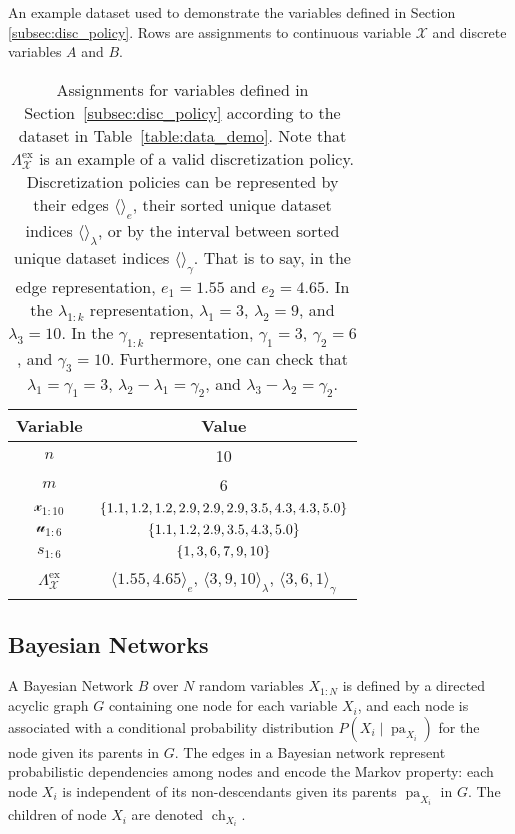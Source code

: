 \documentclass[twoside,11pt]{article}
\newcommand{\curly}[1]{\mathopen{}\mathclose\bgroup\left\{#1\aftergroup\egroup\right\}}
\newcommand{\anglebrackets}[1]{\langle #1 \rangle}
\DeclareMathOperator{\Pa}{pa} %
\DeclareMathOperator{\Ch}{ch} %
\newcommand{\cX}{\mathcal{X}} %
\newcommand{\cx}{\mathcal{x}} %
\newcommand{\cu}{\mathcal{u}} %
\begin{document}
\begin{table}[ht]
  \centering
  \caption{
    An example dataset used to demonstrate the variables defined in Section \ref{subsec:disc_policy}. Rows are assignments to continuous variable $\cX$ and discrete variables $A$ and $B$.
  }
  
  \label{table:data_demo}
  \bigskip
  \centering
  \caption{
    Assignments for variables defined in Section~\ref{subsec:disc_policy} according to the dataset in Table~\ref{table:data_demo}. Note that $\Lambda^{\text{ex}}_{\cX}$ is an example of a valid discretization policy. Discretization policies can be represented by their edges $\anglebrackets{}_{e}$, their sorted unique dataset indices $\anglebrackets{}_{\lambda}$, or by the interval between sorted unique dataset indices $\anglebrackets{}_{\gamma}$. That is to say, in the edge representation, $e_1 = 1.55$ and $e_2 = 4.65$. In the $\lambda_{1:k}$ representation, $\lambda_1 = 3$, $\lambda_2 = 9$, and $\lambda_3 = 10$. In the $\gamma_{1:k}$ representation, $\gamma_1 = 3$, $\gamma_2 = 6$, and $\gamma_3 = 10$. Furthermore, one can check that $\lambda_1 = \gamma_1 = 3$, $\lambda_2 - \lambda_1 = \gamma_2$, and $\lambda_3 - \lambda_2 = \gamma_2$.
  }
	\begin{tabular}{cc}
		\toprule
		Variable &  Value \\
		\midrule
		$n$ &  \num{10} \\
		$m$ &  \num{6} \\
		$\cx_{1:10}$ & $\curly{ 1.1, 1.2, 1.2, 2.9, 2.9, 2.9, 3.5, 4.3, 4.3, 5.0} $\\
		$\cu_{1:6} $ & $\curly{ 1.1,1.2,2.9,3.5,4.3,5.0}$\\
		$s_{1:6}$ & $\curly{1,3,6,7,9,10}$\\
		$\Lambda^{\text{ex}}_{\cX}$ & $\anglebrackets{1.55,4.65}_{e}$, $ \anglebrackets{3 ,9,10}_{\lambda}$, $\anglebrackets{3, 6, 1}_{\gamma} $\\
		\bottomrule
	\end{tabular}
  \label{table:data_demo_2}
\end{table}

\subsection{Bayesian Networks}

A Bayesian Network $B$ over $N$ random variables $X_{1:N}$ is defined by a directed acyclic graph $G$ containing one node for each variable $X_i$, and each node is associated with a conditional probability distribution $P(X_i \mid \Pa_{X_i})$ for the node given its parents in $G$. The edges in a Bayesian network represent probabilistic dependencies among nodes and encode the Markov property: each node $X_i$ is independent of its non-descendants given its parents $\Pa_{X_i}$ in $G$. The children of node $X_i$ are denoted $\Ch_{X_i}$.
\end{document}
